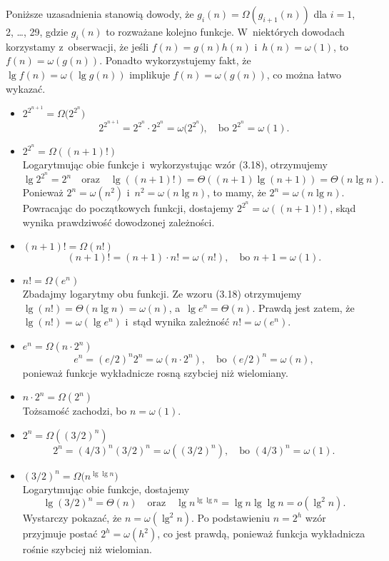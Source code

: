 
\subproblem %
Poniższe uzasadnienia stanowią dowody, że $g_i(n)=\Omega(g_{i+1}(n))$ dla $i=1$, 2, \dots, 29, gdzie $g_i(n)$ to rozważane kolejno funkcje.
W~niektórych dowodach korzystamy z~obserwacji, że jeśli $f(n)=g(n)h(n)$ i~$h(n)=\omega(1)$, to $f(n)=\omega(g(n))$.
Ponadto wykorzystujemy fakt, że $\lg f(n)=\omega(\lg g(n))$ implikuje $f(n)=\omega(g(n))$, co można łatwo wykazać.
\begin{itemize}
\item $2^{2^{n+1}}=\Omega\bigl(2^{2^n}\bigr)$
	\[
		2^{2^{n+1}} = 2^{2^n}\cdot2^{2^n} = \omega\bigl(2^{2^n}\bigr), \quad\text{bo $2^{2^n} = \omega(1)$}.
	\]
\item $2^{2^n}=\Omega((n+1)!)$ \\
	Logarytmując obie funkcje i~wykorzystując wzór (3.18), otrzymujemy
	\[
		\lg 2^{2^n} = 2^n \quad\text{oraz}\quad \lg((n+1)!) = \Theta((n+1)\lg(n+1)) = \Theta(n\lg n).
	\]
	Ponieważ $2^n=\omega(n^2)$ i~$n^2=\omega(n\lg n)$, to mamy, że $2^n=\omega(n\lg n)$.
Powracając do początkowych funkcji, dostajemy $2^{2^n}=\omega((n+1)!)$, skąd wynika prawdziwość dowodzonej zależności.
\item $(n+1)!=\Omega(n!)$
	\[
		(n+1)! = (n+1)\cdot n! = \omega(n!), \quad\text{bo $n+1 = \omega(1)$}.
	\]
\item $n!=\Omega(e^n)$ \\
	Zbadajmy logarytmy obu funkcji.
Ze wzoru (3.18) otrzymujemy $\lg(n!)=\Theta(n\lg n)=\omega(n)$, a~$\lg e^n=\Theta(n)$.
Prawdą jest zatem, że $\lg(n!)=\omega(\lg e^n)$ i~stąd wynika zależność $n!=\omega(e^n)$.
\item $e^n=\Omega(n\cdot2^n)$
	\[
		e^n = (e/2)^n2^n = \omega(n\cdot2^n), \quad\text{bo $(e/2)^n = \omega(n)$},
	\]
	ponieważ funkcje wykładnicze rosną szybciej niż wielomiany.
\item $n\cdot2^n=\Omega(2^n)$ \\
	Tożsamość zachodzi, bo $n=\omega(1)$.
\item $2^n=\Omega((3/2)^n)$
	\[
		2^n = (4/3)^n(3/2)^n = \omega((3/2)^n), \quad\text{bo $(4/3)^n = \omega(1)$}.
	\]
\item $(3/2)^n=\Omega\bigl(n^{\lg\lg n}\bigr)$ \\
	Logarytmując obie funkcje, dostajemy
	\[
		\lg(3/2)^n = \Theta(n) \quad\text{oraz}\quad \lg n^{\lg\lg n} = \lg n\lg\lg n = o(\lg^2n).
	\]
	Wystarczy pokazać, że $n=\omega(\lg^2n)$.
Po podstawieniu $n=2^h$ wzór przyjmuje postać $2^h=\omega(h^2)$, co jest prawdą, ponieważ funkcja wykładnicza rośnie szybciej niż wielomian.

\end{itemize}
